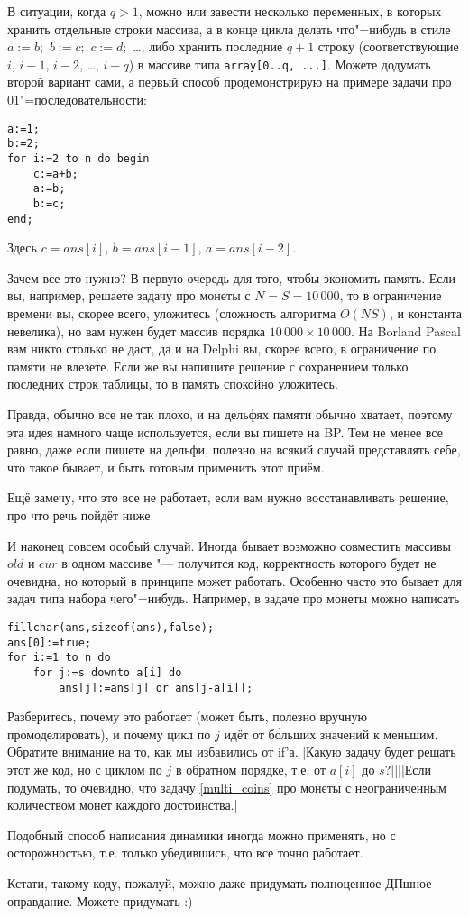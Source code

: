 В ситуации, когда $q>1$, можно или завести несколько переменных, в которых хранить отдельные строки массива, а в конце цикла
делать что"=нибудь в стиле $a:=b;$ $b:=c;$ $c:=d;$ \dots, либо хранить последние $q+1$ строку (соответствующие
$i$, $i-1$, $i-2$, \dots, $i-q$) в массиве типа \texttt{array[0..q, ...]}. Можете додумать второй вариант сами,
а первый способ продемонстрирую на примере задачи про 01"=последовательности:
\begin{codesampleo}\begin{verbatim}
a:=1;
b:=2;
for i:=2 to n do begin
    c:=a+b;
    a:=b;
    b:=c;
end;
\end{verbatim}
\end{codesampleo}
Здесь $c=ans[i]$, $b=ans[i-1]$, $a=ans[i-2]$.

Зачем все это нужно? В первую очередь для того, чтобы экономить память. Если вы, например, решаете задачу про монеты
с $N=S=10\,000$, то в ограничение времени вы, скорее всего, уложитесь (сложность алгоритма $O(NS)$, и константа невелика),
но вам нужен будет массив порядка $10\,000\times 10\,000$. На Borland Pascal
вам никто столько не даст, да и на Delphi вы, скорее всего, в ограничение по памяти не влезете. 
Если же вы напишите решение с сохранением только последних строк таблицы,
то в память спокойно уложитесь.

Правда, обычно все не так плохо, и на дельфях памяти обычно хватает, поэтому эта идея намного чаще 
используется, если вы пишете на BP. Тем не менее все равно, даже если пишете на дельфи, полезно на всякий случай 
представлять себе, что такое бывает, и быть готовым применить этот приём.

Ещё замечу, что это все не работает, если вам нужно восстанавливать решение, про что речь пойдёт ниже.

И наконец совсем особый случай. Иногда бывает возможно совместить массивы $old$ и $cur$ в одном 
массиве "--- получится код, корректность которого будет не очевидна, но который в принципе может работать. Особенно часто 
это бывает для задач типа набора чего"=нибудь. Например, в задаче про монеты можно написать 
\begin{codesampleo}\begin{verbatim}
fillchar(ans,sizeof(ans),false);
ans[0]:=true;
for i:=1 to n do
    for j:=s downto a[i] do
        ans[j]:=ans[j] or ans[j-a[i]];
\end{verbatim}
\end{codesampleo}

Разберитесь, почему это работает (может быть, полезно вручную промоделировать), и почему цикл по 
$j$ идёт от б\'{о}льших значений к меньшим. Обратите внимание на то, как мы избавились от if'а.
\task|Какую задачу будет решать этот же код, но с циклом по $j$ в обратном порядке, т.е.
от $a[i]$ до $s$?||||Если подумать, то очевидно, что задачу \ref{multi_coins} про монеты с неограниченным количеством монет каждого достоинства.|

Подобный способ написания динамики иногда можно применять, но с осторожностью, т.е. только 
убедившись, что все точно работает. 

Кстати, такому коду, пожалуй, можно даже придумать полноценное ДПшное оправдание. Можете придумать 
:)